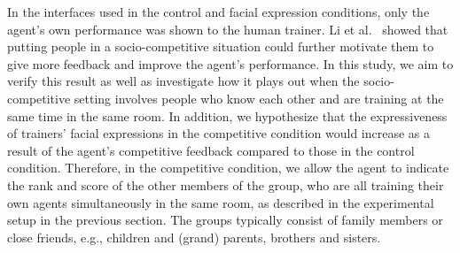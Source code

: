 \documentclass[10pt,journal,compsoc]{IEEEtran}
\begin{document}
In the interfaces used in the control and facial expression conditions, only the agent's own performance was shown to the human trainer. Li et al.\ \cite{li2014learning} showed that putting people in a socio-competitive situation could further motivate them to give more feedback and improve the agent's performance. In this study, we aim to verify this result as well as investigate how it plays out when the socio-competitive setting involves people who know each other and are training at the same time in the same room. In addition, we hypothesize that the expressiveness of trainers' facial expressions in the competitive condition would increase as a result of the agent's competitive feedback compared to those in the control condition. %
Therefore, in the competitive condition, we allow the agent to indicate the rank and score of the other members of the group, who are all training their own agents simultaneously in the same room, as described in the experimental setup in the previous section. The groups typically consist of family members or close friends, e.g., children and (grand) parents, %
 brothers and sisters. %


%
\end{document}
